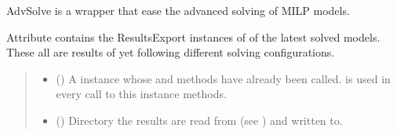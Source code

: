 \documentclass[letterpaper,10pt,english]{sphinxmanual}
\begin{document}
\begin{fulllineitems}
\label{\detokenize{generated/tamos.solve_tools.AdvSolve:tamos.solve_tools.AdvSolve}}
\pysigstartsignatures
{}
\pysigstopsignatures{}

\begin{fulllineitems}
\label{\detokenize{generated/tamos.solve_tools.AdvSolve:tamos.solve_tools.AdvSolve.__init__}}
\pysigstartsignatures
{}
\pysigstopsignatures
\sphinxAtStartPar
AdvSolve is a wrapper that ease the advanced solving of MILP models.

\sphinxAtStartPar
Attribute  contains the ResultsExport instances of of the latest solved models.
These all are results of  yet following different solving configurations.
\begin{quote}\begin{description}
\begin{itemize}
\item {} 
\sphinxAtStartPar
{} ({\hyperref[\detokenize{generated/tamos.MILPModel:tamos.MILPModel}]{}}) \textendash{} A  instance whose  and 
methods have already been called.
 is used in every call to this instance methods.

\item {} 
\sphinxAtStartPar
{} () \textendash{} Directory the results are read from (see ) and written to.


\end{itemize}
\end{description}
\end{quote}
\end{fulllineitems}
\end{fulllineitems}
\end{document}
